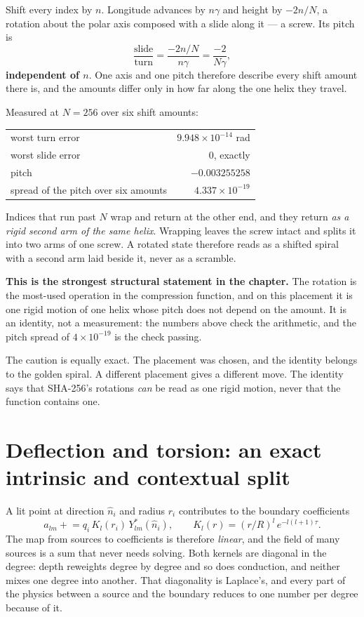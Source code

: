 Shift every index by \(n\). Longitude advances by \(n\gamma\) and height by \(-2n/N\), a rotation about the polar axis composed with a slide along it --- a screw. Its pitch is
\[
  \frac{\text{slide}}{\text{turn}} = \frac{-2n/N}{n\gamma} = \frac{-2}{N\gamma},
\]
\textbf{independent of \(n\)}. One axis and one pitch therefore describe every shift amount there is, and the amounts differ only in how far along the one helix they travel.

Measured at \(N = 256\) over six shift amounts:

\begin{center}
\begin{tabular}{lr}
\toprule
worst turn error & \(9.948 \times 10^{-14}\) rad \\
worst slide error & \(0\), exactly \\
pitch & \(-0.003255258\) \\
spread of the pitch over six amounts & \(4.337 \times 10^{-19}\) \\
\bottomrule
\end{tabular}
\end{center}

Indices that run past \(N\) wrap and return at the other end, and they return \emph{as a rigid second arm of the same helix}. Wrapping leaves the screw intact and splits it into two arms of one screw. A rotated state therefore reads as a shifted spiral with a second arm laid beside it, never as a scramble.

\textbf{This is the strongest structural statement in the chapter.} The rotation is the most-used operation in the compression function, and on this placement it is one rigid motion of one helix whose pitch does not depend on the amount. It is an identity, not a measurement: the numbers above check the arithmetic, and the pitch spread of \(4 \times 10^{-19}\) is the check passing.

The caution is equally exact. The placement was chosen, and the identity belongs to the golden spiral. A different placement gives a different move. The identity says that SHA-256's rotations \emph{can} be read as one rigid motion, never that the function contains one.

\section{Deflection and torsion: an exact intrinsic and contextual split}

A lit point at direction \(\hat n_i\) and radius \(r_i\) contributes to the boundary coefficients
\[
  a_{lm} \mathrel{+}= q_i \, K_l(r_i) \, Y_{lm}^{*}(\hat n_i),
  \qquad
  K_l(r) = (r/R)^{l} \, e^{-l(l+1)\tau}.
\]
The map from sources to coefficients is therefore \emph{linear}, and the field of many sources is a sum that never needs solving. Both kernels are diagonal in the degree: depth reweights degree by degree and so does conduction, and neither mixes one degree into another. That diagonality is Laplace's, and every part of the physics between a source and the boundary reduces to one number per degree because of it.


